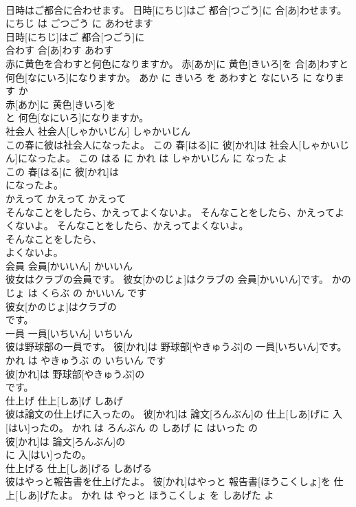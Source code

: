 \documentclass[8pt]{extreport}
\begin{document}
\begin{CJK}{UTF8}{min}
\\	日時はご都合に合わせます。	日時[にちじ]はご 都合[つごう]に 合[あ]わせます。	にちじ は ごつごう に あわせます	
\\	日時[にちじ]はご 都合[つごう]に
\\	合わす	合[あ]わす	あわす	
\\	赤に黄色を合わすと何色になりますか。	赤[あか]に 黄色[きいろ]を 合[あ]わすと 何色[なにいろ]になりますか。	あか に きいろ を あわすと なにいろ に なります か	
\\	赤[あか]に 黄色[きいろ]を
\\	と 何色[なにいろ]になりますか。			
\\	社会人	社会人[しゃかいじん]	しゃかいじん	
\\	この春に彼は社会人になったよ。	この 春[はる]に 彼[かれ]は 社会人[しゃかいじん]になったよ。	この はる に かれ は しゃかいじん に なった よ	
\\	この 春[はる]に 彼[かれ]は
\\	になったよ。			
\\	かえって	かえって	かえって	
\\	そんなことをしたら、かえってよくないよ。	そんなことをしたら、かえってよくないよ。	そんなことをしたら、かえってよくないよ。	
\\	そんなことをしたら、
\\	よくないよ。			
\\	会員	会員[かいいん]	かいいん	
\\	彼女はクラブの会員です。	彼女[かのじょ]はクラブの 会員[かいいん]です。	かのじょ は くらぶ の かいいん です	
\\	彼女[かのじょ]はクラブの
\\	です。			
\\	一員	一員[いちいん]	いちいん	
\\	彼は野球部の一員です。	彼[かれ]は 野球部[やきゅうぶ]の 一員[いちいん]です。	かれ は やきゅうぶ の いちいん です	
\\	彼[かれ]は 野球部[やきゅうぶ]の
\\	です。			
\\	仕上げ	仕上[しあ]げ	しあげ	
\\	彼は論文の仕上げに入ったの。	彼[かれ]は 論文[ろんぶん]の 仕上[しあ]げに 入[はい]ったの。	かれ は ろんぶん の しあげ に はいった の	
\\	彼[かれ]は 論文[ろんぶん]の
\\	に 入[はい]ったの。			
\\	仕上げる	仕上[しあ]げる	しあげる	
\\	彼はやっと報告書を仕上げたよ。	彼[かれ]はやっと 報告書[ほうこくしょ]を 仕上[しあ]げたよ。	かれ は やっと ほうこくしょ を しあげた よ	

\end{CJK}
\end{document}
